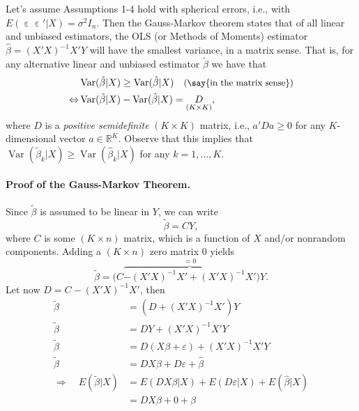\documentclass[
  14pt,
]{memoir}
\DeclareMathOperator{\eps}{\varepsilon}
\DeclareMathOperator{\V}{\operatorname{Var}}
\begin{document}
Let's assume Assumptions 1-4 hold with spherical errors, i.e., with \(E(\eps\eps'|X)=\sigma^{2} I_{n}\). Then the Gauss-Markov theorem states that of all linear and unbiased estimators, the OLS (or Methods of Moments) estimator \(\hat\beta=(X'X)^{-1}X'Y\) will have the smallest variance, in a matrix sense. That is, for any alternative linear and unbiased estimator \(\tilde{\beta}\) we have that
\begin{align*}
&\V(\tilde\beta|X)\geq \V(\hat\beta|X)\quad{\small\text{(\say{in the matrix sense})}}\\
\Leftrightarrow&\V(\tilde\beta|X)-\V(\hat\beta|X)=\underset{(K\times K)}{D},
\end{align*}
where \(D\) is
a \emph{positive semidefinite} \((K\times K)\) matrix, i.e.,
\(a'Da\geq 0\) for any \(K\)-dimensional vector
\(a\in\mathbb{R}^K\). Observe that this implies that
\(\V(\tilde{\beta}_k|X) \geq \V(\hat\beta_k | X)\) for any
\(k=1,\dots,K\).

\paragraph*{Proof of the Gauss-Markov Theorem.}

Since \(\tilde{\beta}\) is assumed to be linear in \(Y\), we can
write
\[
\tilde{\beta}=CY,
\]
where \(C\) is
some \((K\times n)\) matrix, which is a function of \(X\) and/or nonrandom
components. Adding a \((K\times n)\) zero matrix \(0\) yields
\[
\tilde{\beta}=\Big(C\overbrace{-\left(X'X\right)^{-1}X'+\left(X'X\right)^{-1}X'}^{=0}\Big)Y.
\]
Let now \(D=C-\left(X'X\right)^{-1}X'\), then
\begin{align}
\tilde{\beta}&=\left(D+\left(X'X\right)^{-1}X'\right)Y\nonumber\\
\tilde{\beta}&=DY + \left(X'X\right)^{-1}X'Y\nonumber\\
\tilde{\beta}&=D\left(X{\beta}+{\varepsilon}\right) + \left(X'X\right)^{-1}X'Y\nonumber\\
\tilde{\beta}&=DX{\beta}+D{\varepsilon} + \hat{\beta}\label{eq:c3e16}\\[2ex]
\Rightarrow\quad E(\tilde{\beta}|X)&=E(DX{\beta}|X)+E(D{\varepsilon}|X)+E(\hat{\beta}|X)\nonumber\\
&=DX{\beta}+0+{\beta}
\label{eq:c3e17}
\end{align}
\end{document}
